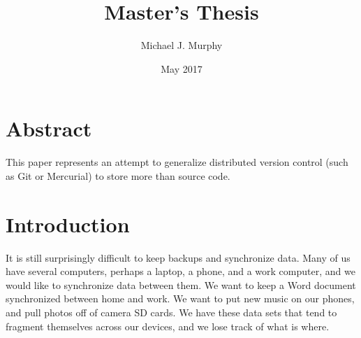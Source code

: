 \documentclass[12pt,a4paper,two-side]{book}
\begin{document}
\title{Master's Thesis}
\author{Michael J. Murphy}
\date{May 2017}
\maketitle

\frontmatter









\chapter{Abstract}

This paper represents an attempt to generalize distributed version control (such
as Git or Mercurial) to store more than source code.








\tableofcontents

{}

\listoffigures
{}


\lstlistoflistings
{}

\mainmatter









\chapter{Introduction}


It is still surprisingly difficult to keep backups and synchronize data. Many of
us have several computers, perhaps a laptop, a phone, and a work computer, and
we would like to synchronize data between them. We want to keep a Word document
synchronized between home and work. We want to put new music on our phones, and
pull photos off of camera SD cards. We have these data sets that tend to
fragment themselves across our devices, and we lose track of what is where.
\end{document}
